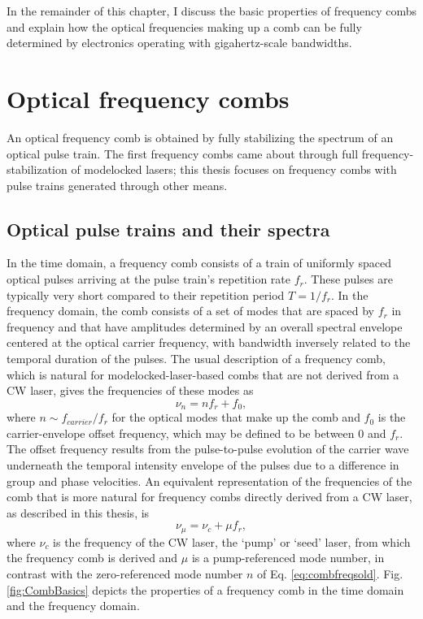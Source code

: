 In the remainder of this chapter, I discuss the basic properties of frequency combs and explain how the optical frequencies making up a comb can be fully determined by electronics operating with gigahertz-scale bandwidths.

\section{Optical frequency combs}

An optical frequency comb is obtained by fully stabilizing the spectrum of an optical pulse train. The first frequency combs came about through full frequency-stabilization of modelocked lasers; this thesis focuses on frequency combs with pulse trains generated through other means.

\subsection{Optical pulse trains and their spectra}

In the time domain, a frequency comb consists of a train of uniformly spaced optical pulses arriving at the pulse train's repetition rate $f_r$. These pulses are typically very short compared to their repetition period $T=1/f_r$. In the frequency domain, the comb consists of a set of modes that are spaced by $f_r$ in frequency and that have amplitudes determined by an overall spectral envelope centered at the optical carrier frequency, with bandwidth inversely related to the temporal duration of the pulses. The usual description of a frequency comb, which is natural for modelocked-laser-based combs that are not derived from a CW laser, gives the frequencies of these modes as 
\begin{equation}
\nu_n=nf_r+f_0, \label{eq:combfreqsold}
\end{equation} 
where $n\sim f_{carrier}/f_r$ for the optical modes that make up the comb and $f_0$ is the carrier-envelope offset frequency, which may be defined to be between $0$ and $f_r$. The offset frequency results from the pulse-to-pulse evolution of the carrier wave underneath the temporal intensity envelope of the pulses due to a difference in group and phase velocities. An equivalent representation of the frequencies of the comb that is more natural for frequency combs directly derived from a CW laser, as described in this thesis, is
\begin{equation}
\nu_\mu=\nu_c+\mu f_r, \label{eq:combfreqsnew}
\end{equation} 
where $\nu_c$ is the frequency of the CW laser, the `pump' or `seed' laser, from which the frequency comb is derived and $\mu$ is a pump-referenced mode number, in contrast with the zero-referenced mode number $n$ of Eq. \ref{eq:combfreqsold}. Fig. \ref{fig:CombBasics} depicts the properties of a frequency comb in the time domain and the frequency domain.

